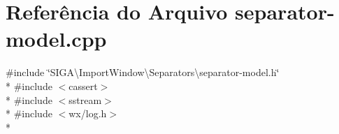 \section{Referência do Arquivo separator-\/model.cpp}
\label{separator-model_8cpp}
{\ttfamily \#include \char`\"{}S\+I\+G\+A\textbackslash{}\+Import\+Window\textbackslash{}\+Separators\textbackslash{}separator-\/model.\+h\char`\"{}}\\*
{\ttfamily \#include $<$cassert$>$}\\*
{\ttfamily \#include $<$sstream$>$}\\*
{\ttfamily \#include $<$wx/log.\+h$>$}\\*
